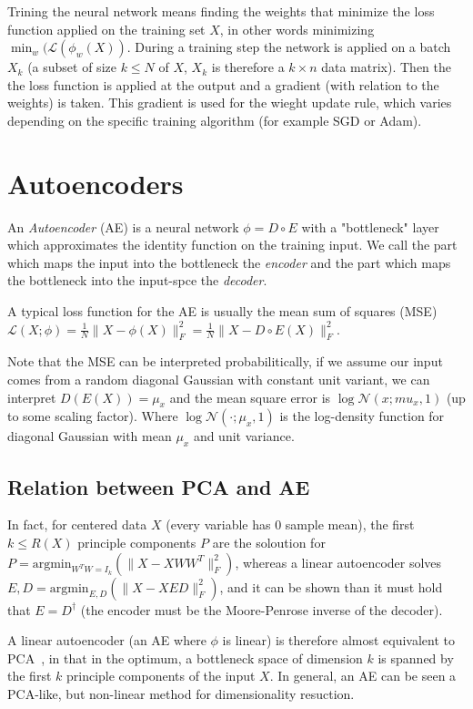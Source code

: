 \documentclass[11pt, a4paper]{report}
\theoremstyle{plain}
\theoremstyle{definition}
\theoremstyle{remark}
\begin{document}
Trining the neural network means finding the weights that minimize the loss function 
applied on the training set $X$, in other words minimizing 
$\min_{w} (\mathcal{L}(\phi_w(X))$.
During a training step the network is applied on a batch $X_k$ (a subset of size
$k \leq N$ of $X$, $X_k$ is therefore a $k\times n$ data matrix). 
Then the the loss function is applied at the output and a gradient
(with relation to the weights) is taken. This gradient is used for the wieght
update rule, which varies depending on the specific training algorithm (for
example SGD or Adam).



\section{Autoencoders}
An \textit{Autoencoder} (AE) is a neural network $\phi = D \circ E$ with a "bottleneck" layer which
approximates the identity function on the training input.
We call the part which maps the input into the bottleneck the \textit{encoder} and the
part which maps the bottleneck into the input-spce the \textit{decoder}.

A typical loss function for the AE is usually the mean sum of squares (MSE)
$\mathcal{L}(X;\phi) = \frac{1}{N}\|X - \phi(X)\|_F^2 = \frac{1}{N}\|X - D \circ
E (X) \|_F^2$.

Note that the MSE can be interpreted probabilitically, if we assume our input
comes from a random diagonal Gaussian with constant unit variant, we can interpret
$D(E(X)) = \mu_x$ and the mean square error is $\log \mathcal{N}(x ; mu_x, 1)$
(up to some scaling factor). Where $\log \mathcal{N}(\cdot ; \mu_x, 1)$ is the 
log-density function for diagonal Gaussian with mean $\mu_x$ and unit variance. 


\subsection{Relation between PCA and AE}
In fact, for centered data $X$ (every variable has $0$ sample mean), the first
$k \leq R(X)$ principle components $P$ are the soloution for 
$P = \text{argmin}_{W^T W = I_k} (\|X - XWW^T\|_F^2)$, whereas a linear autoencoder
solves $E,D = \text{argmin}_{E,D}(\|X - XED\|_F^2)$, and it can be shown than
it must hold that $E = D^{\dagger}$ (the encoder must be the Moore-Penrose
inverse of the decoder).

A linear autoencoder (an AE where $\phi$ is linear) is therefore almost equivalent to
PCA~\cite{plaut2018principal}, in that in the optimum, a bottleneck space of dimension $k$
is spanned by the first $k$ principle components of the input $X$.
In general, an AE can be seen a PCA-like, but non-linear method for
dimensionality resuction.
\end{document}
